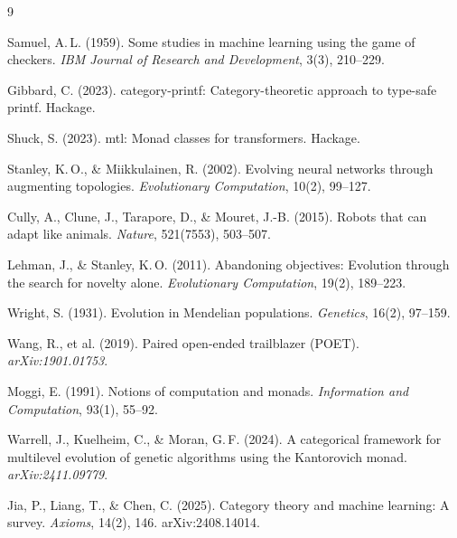 \documentclass[10pt]{article}
\begin{document}
\begin{thebibliography}{9}

Samuel, A.\,L. (1959).
Some studies in machine learning using the game of checkers.
\textit{IBM Journal of Research and Development}, 3(3), 210--229.

Gibbard, C. (2023).
category-printf: Category-theoretic approach to type-safe printf.
Hackage.

Shuck, S. (2023).
mtl: Monad classes for transformers.
Hackage.

Stanley, K.\,O., \& Miikkulainen, R. (2002).
Evolving neural networks through augmenting topologies.
\textit{Evolutionary Computation}, 10(2), 99--127.

Cully, A., Clune, J., Tarapore, D., \& Mouret, J.-B. (2015).
Robots that can adapt like animals.
\textit{Nature}, 521(7553), 503--507.

Lehman, J., \& Stanley, K.\,O. (2011).
Abandoning objectives: Evolution through the search for novelty alone.
\textit{Evolutionary Computation}, 19(2), 189--223.

Wright, S. (1931).
Evolution in Mendelian populations.
\textit{Genetics}, 16(2), 97--159.

Wang, R., et al. (2019).
Paired open-ended trailblazer (POET).
\textit{arXiv:1901.01753}.

Moggi, E. (1991).
Notions of computation and monads.
\textit{Information and Computation}, 93(1), 55--92.

Warrell, J., Kuelheim, C., \& Moran, G.\,F. (2024).
A categorical framework for multilevel evolution of genetic algorithms using the Kantorovich monad.
\textit{arXiv:2411.09779}.

Jia, P., Liang, T., \& Chen, C. (2025).
Category theory and machine learning: A survey.
\textit{Axioms}, 14(2), 146.
arXiv:2408.14014.

\end{thebibliography}
\end{document}
